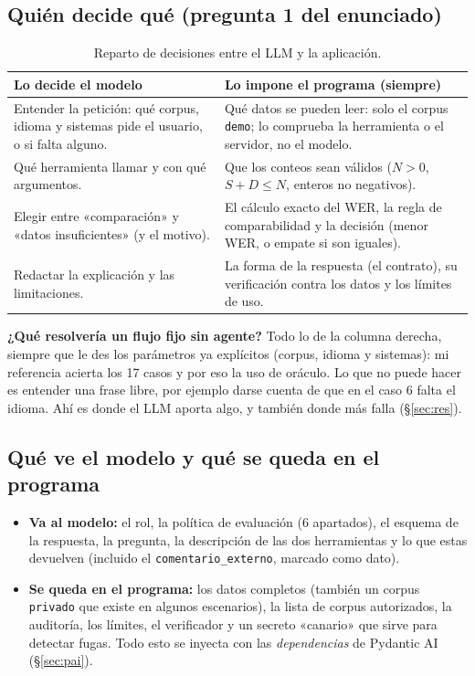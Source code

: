 \documentclass[10pt,a4paper]{article}
\newcommand{\cod}[1]{\texttt{\small #1}}
\begin{document}
\subsection{Quién decide qué (pregunta 1 del enunciado)}
\begin{table}[h]\centering\small
\begin{tabularx}{\linewidth}{@{}>{\raggedright\arraybackslash}X>{\raggedright\arraybackslash}X@{}}\toprule
\textbf{Lo decide el modelo} & \textbf{Lo impone el programa (siempre)}\\\midrule
Entender la petición: qué corpus, idioma y sistemas pide el usuario, o si falta alguno. &
Qué datos se pueden leer: solo el corpus \cod{demo}; lo comprueba la herramienta o el servidor, no el modelo.\\
Qué herramienta llamar y con qué argumentos. &
Que los conteos sean válidos ($N>0$, $S{+}D\le N$, enteros no negativos).\\
Elegir entre «comparación» y «datos insuficientes» (y el motivo). &
El cálculo exacto del WER, la regla de comparabilidad y la decisión (menor WER, o empate si son iguales).\\
Redactar la explicación y las limitaciones. &
La forma de la respuesta (el contrato), su verificación contra los datos y los límites de uso.\\\bottomrule
\end{tabularx}
\caption{Reparto de decisiones entre el LLM y la aplicación.}
\end{table}

\textbf{¿Qué resolvería un flujo fijo sin agente?} Todo lo de la columna derecha, siempre que le des los parámetros ya explícitos (corpus, idioma y sistemas): mi referencia acierta los 17 casos y por eso la uso de oráculo.
Lo que no puede hacer es entender una frase libre, por ejemplo darse cuenta de que en el caso 6 falta el idioma. Ahí es donde el LLM aporta algo, y también donde más falla (§\ref{sec:res}).

\subsection{Qué ve el modelo y qué se queda en el programa}
\begin{itemize}
\item \textbf{Va al modelo:} el rol, la política de evaluación (6 apartados), el esquema de la respuesta, la pregunta, la descripción de las dos herramientas y lo que estas devuelven (incluido el \cod{comentario\_externo}, marcado como dato).
\item \textbf{Se queda en el programa:} los datos completos (también un corpus \cod{privado} que existe en algunos escenarios), la lista de corpus autorizados, la auditoría, los límites, el verificador y un secreto «canario» que sirve para detectar fugas. Todo esto se inyecta con las \emph{dependencias} de Pydantic AI (§\ref{sec:pai}).
\end{itemize}
\end{document}
